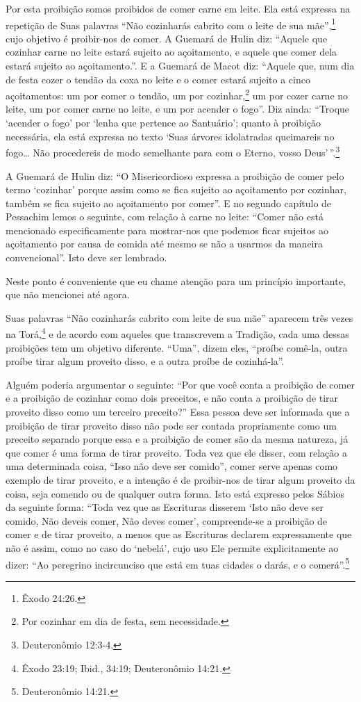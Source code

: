 Por esta proibição somos proibidos de comer carne em leite. Ela está
expressa na repetição de Suas palavras ``Não cozinharás cabrito com o
leite de sua mãe'',\footnote{Êxodo 24:26.} cujo objetivo é proibir-nos de comer.
A Guemará de Hulin diz: ``Aquele que cozinhar carne no leite estará
sujeito ao açoitamento, e aquele que comer dela estará sujeito ao
açoitamento.''. E a Guemará de Macot diz: ``Aquele que, num dia de festa
cozer o tendão da coxa no leite e o comer estará sujeito a cinco
açoitamentos: um por comer o tendão, um por
cozinhar,\footnote{Por cozinhar em dia de festa, sem necessidade.} um por cozer carne no leite, um por
comer carne no leite, e um por acender o fogo''. Diz ainda: ``Troque
`acender o fogo' por `lenha que pertence ao Santuário'; quanto à
proibição necessária, ela está expressa no texto `Suas árvores
idolatradas queimareis no fogo\ldots{} Não procedereis de modo semelhante
para com o Eterno, vosso Deus'\,''.\footnote{Deuteronômio 12:3-4.}

A Guemará de Hulin diz: ``O Misericordioso expressa a proibição de comer
pelo termo `cozinhar' porque assim como se fica sujeito ao açoitamento
por cozinhar, também se fica sujeito ao açoitamento por comer''. E no
segundo capítulo de Pessachim lemos o seguinte, com relação à carne no
leite: ``Comer não está mencionado especificamente para mostrar-nos que
podemos ficar sujeitos ao açoitamento por causa de comida até mesmo se
não a usarmos da maneira convencional''. Isto deve ser lembrado.

Neste ponto é conveniente que eu chame atenção para um princípio
importante, que não mencionei até agora.

Suas palavras ``Não cozinharás cabrito com leite de sua mãe'' aparecem
três vezes na Torá,\footnote{Êxodo 23:19; Ibid., 34:19; Deuteronômio 14:21.} e de acordo com aqueles que
transcrevem a Tradição, cada uma dessas proibições tem um objetivo
diferente. ``Uma'', dizem eles, ``proíbe comê-la, outra proíbe tirar
algum proveito disso, e a outra proíbe de cozinhá-la''.

Alguém poderia argumentar o seguinte: ``Por que você conta a proibição
de comer e a proibição de cozinhar como dois preceitos, e não conta a
proibição de tirar proveito disso como um terceiro preceito?'' Essa
pessoa deve ser informada que a proibição de tirar proveito disso não
pode ser contada propriamente como um preceito separado porque essa e a
proibição de comer são da mesma natureza, já que comer é uma forma de
tirar proveito. Toda vez que ele disser, com relação a uma determinada
coisa, ``Isso não deve ser comido'', comer serve apenas como exemplo de
tirar proveito, e a intenção é de proibir-nos de tirar algum proveito da
coisa, seja comendo ou de qualquer outra forma. Isto está expresso pelos
Sábios da seguinte forma: ``Toda vez que as Escrituras disserem `Isto
não deve ser comido, Não deveis comer, Não deves comer', compreende-se a
proibição de comer e de tirar proveito, a menos que as Escrituras
declarem expressamente que não é assim, como no caso do `nebelá', cujo
uso Ele permite explicitamente ao dizer: ``Ao peregrino incircunciso que está em tuas cidades o darás, e o comerá''.\footnote{Deuteronômio 14:21.}

